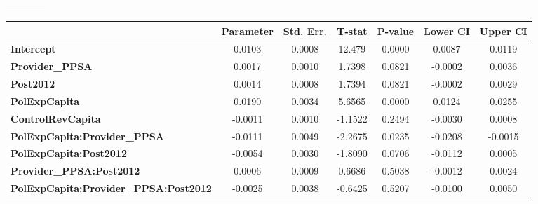 \begin{center}
\begin{tabular}{lclc}
\textbf{}                                     &                    & \textbf{                     }   &                  \\
\bottomrule
\end{tabular}
\begin{tabular}{lcccccc}
                                              & \textbf{Parameter} & \textbf{Std. Err.} & \textbf{T-stat} & \textbf{P-value} & \textbf{Lower CI} & \textbf{Upper CI}  \\
\midrule
\textbf{Intercept}                            &       0.0103       &       0.0008       &      12.479     &      0.0000      &       0.0087      &       0.0119       \\
\textbf{Provider\_PPSA}                       &       0.0017       &       0.0010       &      1.7398     &      0.0821      &      -0.0002      &       0.0036       \\
\textbf{Post2012}                             &       0.0014       &       0.0008       &      1.7394     &      0.0821      &      -0.0002      &       0.0029       \\
\textbf{PolExpCapita}                         &       0.0190       &       0.0034       &      5.6565     &      0.0000      &       0.0124      &       0.0255       \\
\textbf{ControlRevCapita}                     &      -0.0011       &       0.0010       &     -1.1522     &      0.2494      &      -0.0030      &       0.0008       \\
\textbf{PolExpCapita:Provider\_PPSA}          &      -0.0111       &       0.0049       &     -2.2675     &      0.0235      &      -0.0208      &      -0.0015       \\
\textbf{PolExpCapita:Post2012}                &      -0.0054       &       0.0030       &     -1.8090     &      0.0706      &      -0.0112      &       0.0005       \\
\textbf{Provider\_PPSA:Post2012}              &       0.0006       &       0.0009       &      0.6686     &      0.5038      &      -0.0012      &       0.0024       \\
\textbf{PolExpCapita:Provider\_PPSA:Post2012} &      -0.0025       &       0.0038       &     -0.6425     &      0.5207      &      -0.0100      &       0.0050       \\
\bottomrule
\end{tabular}
\end{center}